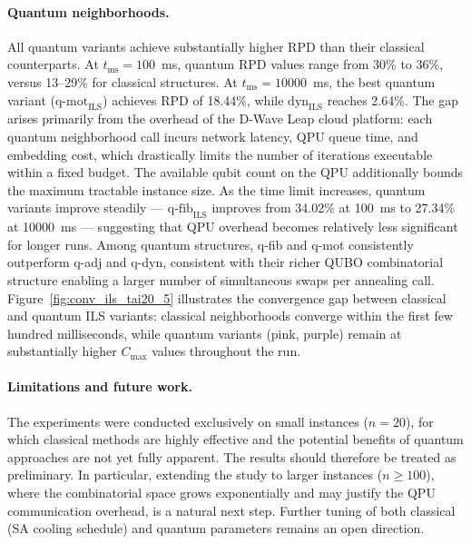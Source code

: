 \documentclass[10pt,twoside,twocolumn,a4paper]{article}
\begin{document}
\paragraph{Quantum neighborhoods.}
All quantum variants achieve substantially higher RPD than their classical counterparts. At $t_{\mathrm{ms}}=100$~ms, quantum RPD values range from 30\% to 36\%, versus 13--29\% for classical structures. At $t_{\mathrm{ms}}=10000$~ms, the best quantum variant ($\mathrm{q\text{-}mot}_{\mathrm{ILS}}$) achieves RPD of 18.44\%, while $\mathrm{dyn}_{\mathrm{ILS}}$ reaches 2.64\%. The gap arises primarily from the overhead of the D-Wave Leap cloud platform: each quantum neighborhood call incurs network latency, QPU queue time, and embedding cost, which drastically limits the number of iterations executable within a fixed budget. The available qubit count on the QPU additionally bounds the maximum tractable instance size. As the time limit increases, quantum variants improve steadily --- $\mathrm{q\text{-}fib}_{\mathrm{ILS}}$ improves from 34.02\% at 100~ms to 27.34\% at 10000~ms --- suggesting that QPU overhead becomes relatively less significant for longer runs. Among quantum structures, q-fib and q-mot consistently outperform q-adj and q-dyn, consistent with their richer QUBO combinatorial structure enabling a larger number of simultaneous swaps per annealing call. Figure~\ref{fig:conv_ils_tai20_5} illustrates the convergence gap between classical and quantum ILS variants: classical neighborhoods converge within the first few hundred milliseconds, while quantum variants (pink, purple) remain at substantially higher $C_{\max}$ values throughout the run.


\paragraph{Limitations and future work.}
The experiments were conducted exclusively on small instances ($n=20$), for which classical methods are highly effective and the potential benefits of quantum approaches are not yet fully apparent. The results should therefore be treated as preliminary. In particular, extending the study to larger instances ($n \ge 100$), where the combinatorial space grows exponentially and may justify the QPU communication overhead, is a natural next step. Further tuning of both classical (SA cooling schedule) and quantum parameters remains an open direction.


%
\end{document}
